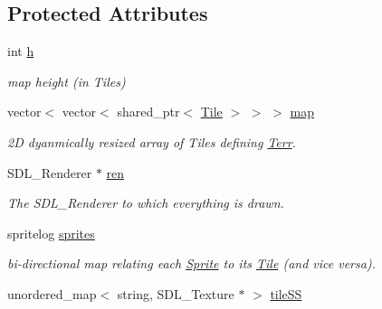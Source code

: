 \subsection*{Protected Attributes}
\begin{DoxyCompactItemize}
\item 
int \hyperlink{class_terr_aa2f06b09cb8abd0fda4abb2b696f6885}{h}\hypertarget{class_terr_aa2f06b09cb8abd0fda4abb2b696f6885}{}\label{class_terr_aa2f06b09cb8abd0fda4abb2b696f6885}

\begin{DoxyCompactList}\small\item\em map height (in Tiles) \end{DoxyCompactList}\item 
vector$<$ vector$<$ shared\+\_\+ptr$<$ \hyperlink{class_tile}{Tile} $>$ $>$ $>$ \hyperlink{class_terr_a09bb829623ee8c32ab5ea1a41ccc9d1f}{map}\hypertarget{class_terr_a09bb829623ee8c32ab5ea1a41ccc9d1f}{}\label{class_terr_a09bb829623ee8c32ab5ea1a41ccc9d1f}

\begin{DoxyCompactList}\small\item\em 2D dyanmically resized array of Tiles defining \hyperlink{class_terr}{Terr}. \end{DoxyCompactList}\item 
S\+D\+L\+\_\+\+Renderer $\ast$ \hyperlink{class_terr_afb5f048d36c4633dffba85e9a959fc68}{ren}\hypertarget{class_terr_afb5f048d36c4633dffba85e9a959fc68}{}\label{class_terr_afb5f048d36c4633dffba85e9a959fc68}

\begin{DoxyCompactList}\small\item\em The S\+D\+L\+\_\+\+Renderer to which everything is drawn. \end{DoxyCompactList}\item 
spritelog \hyperlink{class_terr_a633f21d6e20c549f8006104ae4363bea}{sprites}\hypertarget{class_terr_a633f21d6e20c549f8006104ae4363bea}{}\label{class_terr_a633f21d6e20c549f8006104ae4363bea}

\begin{DoxyCompactList}\small\item\em bi-\/directional map relating each \hyperlink{class_sprite}{Sprite} to its \hyperlink{class_tile}{Tile} (and vice versa). \end{DoxyCompactList}\item 
unordered\+\_\+map$<$ string, S\+D\+L\+\_\+\+Texture $\ast$ $>$ \hyperlink{class_terr_afdb5b0cf8c28af1c3137199038f1fd41}{tile\+SS}\hypertarget{class_terr_afdb5b0cf8c28af1c3137199038f1fd41}{}\label{class_terr_afdb5b0cf8c28af1c3137199038f1fd41}


\end{DoxyCompactItemize}
